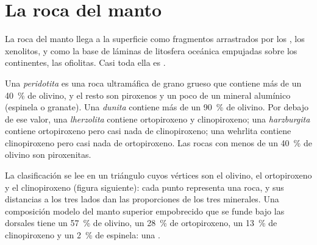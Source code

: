 \section{La roca del manto}\label{sec:b2:mantle-melting:rock}

La roca del manto llega a la superficie como fragmentos arrastrados por los , los
xenolitos, y como la base de láminas de litosfera oceánica empujadas sobre los
continentes, las ofiolitas. Casi toda ella es .

\begin{definition}\label{def:b2:mantle-melting:peridotites}
Una \emph{peridotita} es una roca ultramáfica de grano grueso
que contiene más de un \qty{40}{\percent} de olivino, y el resto son piroxenos y un
poco de un mineral alumínico (espinela o granate). Una
\emph{dunita} contiene más de un \qty{90}{\percent} de olivino. Por debajo
de ese valor, una \emph{lherzolita} contiene ortopiroxeno y
clinopiroxeno; una \emph{harzburgita} contiene ortopiroxeno pero
casi nada de clinopiroxeno; una wehrlita contiene clinopiroxeno pero casi nada de
ortopiroxeno. Las rocas con menos de un \qty{40}{\percent} de olivino son piroxenitas.
\end{definition}

La clasificación se lee en un triángulo cuyos vértices son el olivino, el
ortopiroxeno y el clinopiroxeno (figura siguiente): cada punto representa una roca,
y sus distancias a los tres lados dan las proporciones de los tres
minerales. Una composición modelo del manto superior empobrecido que se funde bajo
las dorsales tiene un \qty{57}{\percent} de olivino,
un \qty{28}{\percent} de ortopiroxeno, un \qty{13}{\percent} de clinopiroxeno y un
\qty{2}{\percent} de espinela: una .

